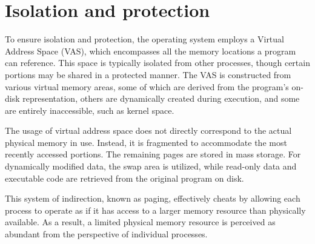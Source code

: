 \section{Isolation and protection}

To ensure isolation and protection, the operating system employs a Virtual Address Space (VAS), which encompasses all the memory locations a program can reference. 
This space is typically isolated from other processes, though certain portions may be shared in a protected manner. 
The VAS is constructed from various virtual memory areas, some of which are derived from the program's on-disk representation, others are dynamically created during execution, and some are entirely inaccessible, such as kernel space.

The usage of virtual address space does not directly correspond to the actual physical memory in use. 
Instead, it is fragmented to accommodate the most recently accessed portions. The remaining pages are stored in mass storage. 
For dynamically modified data, the swap area is utilized, while read-only data and executable code are retrieved from the original program on disk.

This system of indirection, known as paging, effectively cheats by allowing each process to operate as if it has access to a larger memory resource than physically available. 
As a result, a limited physical memory resource is perceived as abundant from the perspective of individual processes.